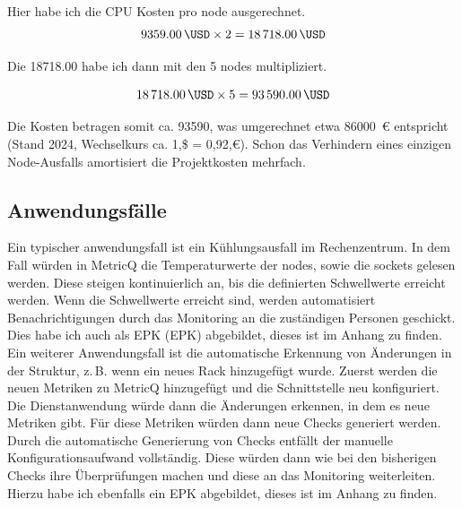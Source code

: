 \noindent
Hier habe ich die \acrshort{CPU} Kosten pro \Gls{node} ausgerechnet.
\[
  \qty{9359.00}{\USD} \times 2 = \qty{18718.00}{\USD}
\]

\noindent
Die \qty{18718.00}{\USD} habe ich dann mit den 5 \Gls{node}s multipliziert.

\[
  \qty{18718.00}{\USD} \times 5 = \qty{93590.00}{\USD}
\]

\noindent
Die Kosten betragen somit ca. \qty[group-separator={.}]{93590}{\USD}, was umgerechnet etwa \qty[group-separator={.}]{86000}{\euro} entspricht (Stand 2024, Wechselkurs ca. 1,\$ = 0,92,€).
Schon das Verhindern eines einzigen Node-Ausfalls amortisiert die Projektkosten mehrfach.

\subsection{Anwendungsfälle}
Ein typischer \Gls{anwendungsfall} ist ein Kühlungsausfall im Rechenzentrum.
In dem Fall würden in \Gls{MetricQ} die Temperaturwerte der \Gls{node}s, sowie die \Gls{socket}s gelesen werden.
Diese steigen kontinuierlich an, bis die definierten Schwellwerte erreicht werden.
Wenn die Schwellwerte erreicht sind, werden automatisiert Benachrichtigungen durch das Monitoring an die zuständigen Personen geschickt.
Dies habe ich auch als \acrlong{EPK} (\acrshort{EPK}) abgebildet, dieses ist im Anhang  zu finden.
Ein weiterer Anwendungsfall ist die automatische Erkennung von Änderungen in der Struktur, z.\,B. wenn ein neues Rack hinzugefügt wurde.
Zuerst werden die neuen Metriken zu \Gls{MetricQ} hinzugefügt und die Schnittstelle neu konfiguriert.
Die Dienstanwendung würde dann die Änderungen erkennen, in dem es neue Metriken gibt.
Für diese Metriken würden dann neue Checks generiert werden.
Durch die automatische Generierung von Checks entfällt der manuelle Konfigurationsaufwand vollständig.
Diese würden dann wie bei den bisherigen Checks ihre Überprüfungen machen und diese an das Monitoring weiterleiten.
Hierzu habe ich ebenfalls ein \acrlong{EPK} abgebildet, dieses ist im Anhang  zu finden.

